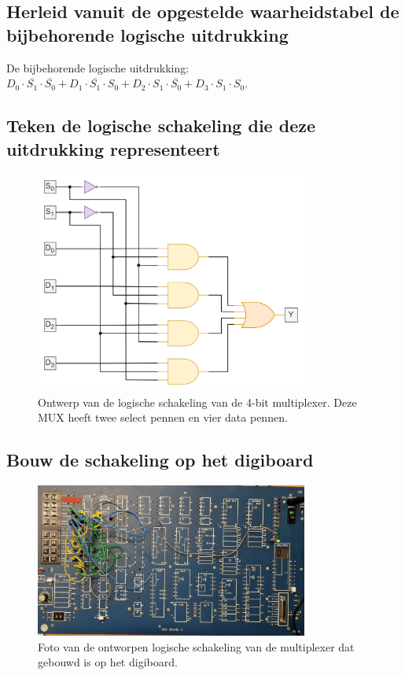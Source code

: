 \documentclass[12pt]{article}
\begin{document}
\subsection{Herleid vanuit de opgestelde waarheidstabel de bijbehorende logische uitdrukking}
De bijbehorende logische uitdrukking: $D_0 \cdot \overline{S_1} \cdot \overline{S_0} + D_1 \cdot \overline{S_1} \cdot S_0 + D_2 \cdot S_1 \cdot \overline{S_0} + D_3 \cdot S_1 \cdot S_0$.
\subsection{Teken de logische schakeling die deze uitdrukking representeert}
\begin{figure}[h]
    \centering
    \includegraphics[width=0.8\textwidth]{mux2.png}
    \caption{Ontwerp van de logische schakeling van de 4-bit multiplexer. Deze MUX heeft twee select pennen en vier data pennen.}
    \label{fig:mux2}
\end{figure}
\pagebreak
\subsection{Bouw de schakeling op het digiboard}
\begin{figure}[h]
    \centering
    \includegraphics[width=0.8\textwidth]{mux.jpg}
    \caption{Foto van de ontworpen logische schakeling van de multiplexer dat gebouwd is op het digiboard.}
    \label{fig:muxsxie}
\end{figure}
\end{document}
